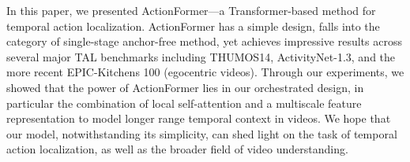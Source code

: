 In this paper, we presented ActionFormer---a Transformer-based method for temporal action localization. ActionFormer has a simple design, falls into the category of single-stage anchor-free method, yet achieves impressive results across several major TAL benchmarks including THUMOS14, ActivityNet-1.3, and the more recent EPIC-Kitchens 100 (egocentric videos). Through our experiments, we showed that the power of ActionFormer lies in our orchestrated design, in particular the combination of local self-attention and a multiscale feature representation to model longer range temporal context in videos. We hope that our model, notwithstanding its simplicity, can shed light on the task of temporal action localization, as well as the broader field of video understanding.


\newpage